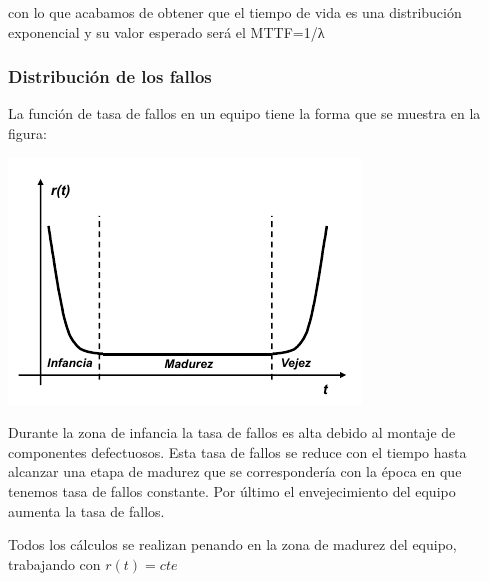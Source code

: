 con lo que acabamos de obtener que el tiempo de vida es una distribución exponencial y su valor esperado será el MTTF=1/λ

\newpage
\subsubsection{Distribución de los fallos}

La función de tasa de fallos en un equipo tiene la forma que se muestra en la figura:
\begin{center}
\includegraphics[width=0.7\linewidth]{img/tasa_fallos.png}
\end{center}

Durante la zona de infancia la tasa de fallos es alta debido al montaje de componentes defectuosos. Esta tasa de fallos se reduce con el tiempo hasta alcanzar una etapa de madurez que se correspondería con la época en que tenemos tasa de fallos constante. Por último el envejecimiento del equipo aumenta la tasa de fallos.

Todos los cálculos se realizan penando en la zona de madurez del equipo, trabajando con $r(t)=cte$

